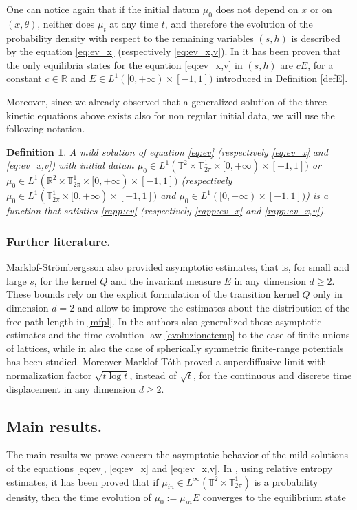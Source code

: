 \documentclass[a4paper,10pt,reqno]{amsart}
\newtheorem{definition}{Definition}[section]
\numberwithin{equation}{subsection}
\numberwithin{figure}{subsection}
\begin{document}
One can notice again that if the initial datum $\mu_0$ does not depend on $x$ or on $(x,\theta)$, neither does $\mu_t$ at any time $t$, and therefore the evolution of the probability density with respect to the remaining variables $(s,h)$ is described by the equation \eqref{eq:ev_x} (respectively \eqref{eq:ev_x,v}). In \cite{CG2010,MS2008bgl} it has been proven that the only equilibria states for the equation \eqref{eq:ev_x,v} in $(s,h)$ are $cE$, for a constant $c\in\mathbb{R}$ and $E\in L^1([0,+\infty)\times[-1,1])$ introduced in Definition \ref{defE}.

Moreover, since we already observed that a generalized solution of the three kinetic equations above exists also for non regular initial data, we will use the following notation.

\begin{definition}\label{def:soluzione} A mild solution of equation \eqref{eq:ev} (respectively \eqref{eq:ev_x} and \eqref{eq:ev_x,v}) with initial datum $\mu_0\in L^1(\mathbb{T}^2\times\mathbb{T}^1_{2\pi}\times[0,+\infty)\times[-1,1])$ or $\mu_0\in L^1(\mathbb{R}^2\times\mathbb{T}^1_{2\pi}\times[0,+\infty)\times[-1,1])$ (respectively $\mu_0\in L^1(\mathbb{T}^1_{2\pi}\times[0,+\infty)\times[-1,1])$ and $\mu_0\in L^1([0,+\infty)\times[-1,1])$) is a function that satisties \eqref{rapp:ev} (respectively \eqref{rapp:ev_x} and \eqref{rapp:ev_x,v}).
\end{definition}

\subsubsection{Further literature.} Marklof-Str\"ombergsson \cite{MS2011ae} also provided asymptotic estimates, that is, for small and large $s$, for the kernel $Q$ and the invariant measure $E$ in any dimension $d\geq2$. These bounds rely on the explicit formulation of the transition kernel $Q$ only in dimension $d=2$ and allow to improve the estimates about the distribution of the free path length in \eqref{mfpl}. In \cite{MS2013pld} the authors also generalized these asymptotic estimates and the time evolution law \eqref{evoluzionetemp} to the case of finite unions of lattices, while in \cite{MS2024} also the case of spherically symmetric finite-range potentials has been studied. Moreover Marklof-T\'oth \cite{MT2016} proved a superdiffusive limit with normalization factor $\sqrt{t\log t}$, instead of $\sqrt t$, for the continuous and discrete time displacement in any dimension $d\geq2$.
\subsection{Main results.} The main results we prove concern the asymptotic behavior of the mild solutions of the equations \eqref{eq:ev}, \eqref{eq:ev_x} and \eqref{eq:ev_x,v}. In \cite{CG2010}, using relative entropy estimates, it has been proved that if $\mu_{in}\in L^{\infty}(\mathbb{T}^2\times\mathbb{T}^1_{2\pi})$ is a probability density, then the time evolution of $\mu_0:=\mu_{in}E$ converges to the equilibrium state
\end{document}
